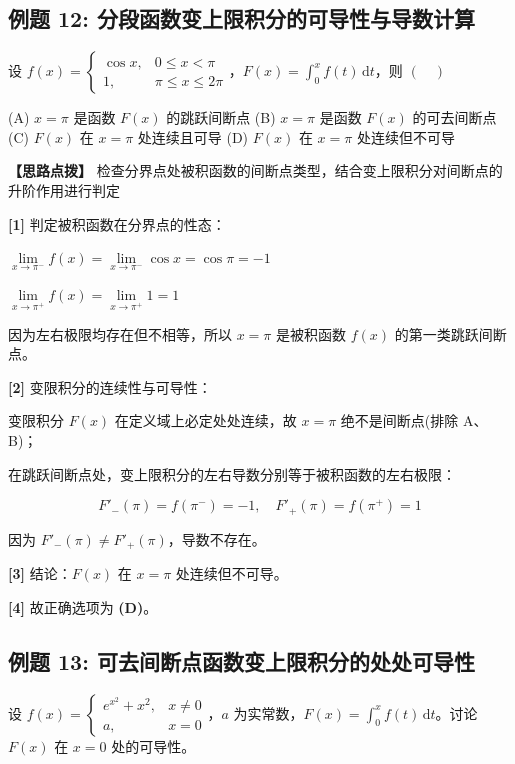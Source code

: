 \documentclass[11pt,a4paper,UTF8]{ctexart}
\begin{document}
\subsection{例题 12: 分段函数变上限积分的可导性与导数计算}

设 $f(x) = \begin{cases} \cos x, & 0 \leqslant x < \pi \\ 1, & \pi \leqslant x \leqslant 2\pi \end{cases}$，$F(x) = \int_0^x f(t)\,\mathrm{d}t$，则 $(\quad)$

(A) $x = \pi$ 是函数 $F(x)$ 的跳跃间断点
(B) $x = \pi$ 是函数 $F(x)$ 的可去间断点
(C) $F(x)$ 在 $x = \pi$ 处连续且可导
(D) $F(x)$ 在 $x = \pi$ 处连续但不可导

\textbf{\color{DeepPurple}【思路点拨】} 检查分界点处被积函数的间断点类型，结合变上限积分对间断点的升阶作用进行判定


\begin{solbox}[分步推导与答题规范]
\textbf{[1]} 判定被积函数在分界点的性态：

$\lim\limits_{x \to \pi^-} f(x) = \lim\limits_{x \to \pi^-} \cos x = \cos \pi = -1$

$\lim\limits_{x \to \pi^+} f(x) = \lim\limits_{x \to \pi^+} 1 = 1$

因为左右极限均存在但不相等，所以 $x = \pi$ 是被积函数 $f(x)$ 的第一类跳跃间断点。

\textbf{[2]} 变限积分的连续性与可导性：

变限积分 $F(x)$ 在定义域上必定处处连续，故 $x = \pi$ 绝不是间断点(排除 A、B)；

在跳跃间断点处，变上限积分的左右导数分别等于被积函数的左右极限：


\begin{equation*}
F'_-( \pi ) = f(\pi^-) = -1, \quad F'_+(\pi) = f(\pi^+) = 1
\end{equation*}


因为 $F'_-( \pi ) \neq F'_+(\pi)$，导数不存在。

\textbf{[3]} 结论：$F(x)$ 在 $x = \pi$ 处连续但不可导。

\textbf{[4]} 故正确选项为 \textbf{(D)}。
\end{solbox}


\subsection{例题 13: 可去间断点函数变上限积分的处处可导性}

设 $f(x) = \begin{cases} e^{x^2} + x^2, & x \neq 0 \\ a, & x = 0 \end{cases}$，$a$ 为实常数，$F(x) = \int_0^x f(t)\,\mathrm{d}t$。讨论 $F(x)$ 在 $x = 0$ 处的可导性。
\end{document}
